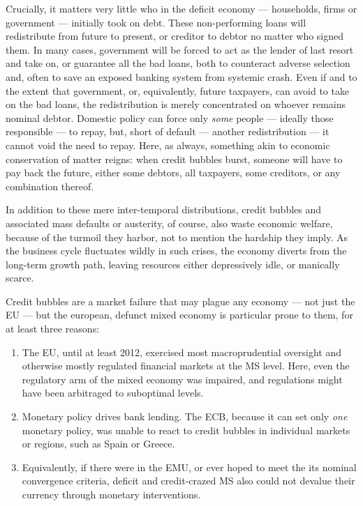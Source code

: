 \documentclass[11pt,a4paper,oneside,openright]{article}
\begin{document}
\begin{description}
\begin{enumerate}
		Crucially, it matters very little who in the deficit economy --- households, firms or government --- initially took on debt. 
		These non-performing loans will redistribute from future to present, or creditor to debtor no matter who signed them. 
		In many cases, government will be forced to act as the lender of last resort and take on, or guarantee all the bad loans, both to counteract adverse selection and, often to save an exposed banking system from systemic crash. 
		Even if and to the extent that government, or, equivalently, future taxpayers, can avoid to take on the bad loans, the redistribution is merely concentrated on whoever remains nominal debtor. 
		Domestic policy can force only \emph{some} people --- ideally those responsible --- to repay, but, short of default --- another redistribution --- it cannot void the need to repay. 
		Here, as always, something akin to economic conservation of matter reigns: 
		when credit bubbles burst, someone will have to pay back the future, either some debtors, all taxpayers, some creditors, or any combination thereof.
		
		In addition to these mere inter-temporal distributions, credit bubbles and associated mass defaults or austerity, of course, also waste economic welfare, because of the turmoil they harbor, not to mention the hardship they imply. 
		As the business cycle fluctuates wildly in such crises, the economy diverts from the long-term growth path, leaving resources either depressively idle, or manically scarce.
		
		Credit bubbles are a market failure that may plague any economy --- not just the \gls{EU} --- but the european, defunct mixed economy is particular prone to them, for at least three reasons:
		\begin{enumerate}
			\item The \gls{EU}, until at least 2012, exercised most macroprudential oversight and otherwise mostly regulated financial markets at the \gls{MS} level. 
			Here, even the regulatory arm of the mixed economy was impaired, and regulations might have been arbitraged to suboptimal levels. %
			\item Monetary policy drives bank lending. 
			The \gls{ECB}, because it can set only \emph{one} monetary policy, was unable to react to credit bubbles in individual markets or regions, such as Spain or Greece. 
			\item Equivalently, if there were in the \gls{EMU}, or ever hoped to meet the its nominal convergence criteria, deficit and credit-crazed \gls{MS} also could not devalue their currency through monetary interventions.
		\end{enumerate}
	\end{enumerate}
	

\end{description}
\end{document}
